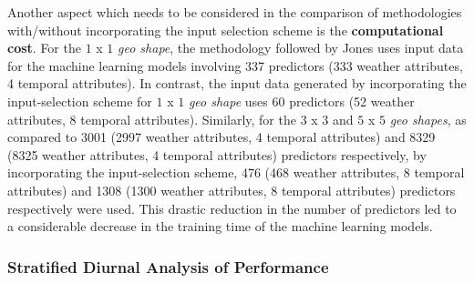 \par Another aspect which needs to be considered in the comparison of methodologies with/without incorporating the input selection scheme is the \textbf{computational cost}. For the $1$ x $1$ \textit{geo shape}, the methodology followed by Jones \cite{thesis_zach} uses input data for the machine learning models involving 337 predictors (333 weather attributes, 4 temporal attributes). In contrast, the input data generated by incorporating the input-selection scheme for $1$ x $1$ \textit{geo shape} uses 60 predictors (52 weather attributes, 8 temporal attributes). Similarly, for the $3$ x $3$ and $5$ x $5$ \textit{geo shapes}, as compared to 3001 (2997 weather attributes, 4 temporal attributes) and 8329 (8325 weather attributes, 4 temporal attributes) predictors respectively, by incorporating the input-selection scheme, 476 (468 weather attributes, 8 temporal attributes) and 1308 (1300 weather attributes, 8 temporal attributes) predictors respectively were used. This drastic reduction in the number of predictors led to a considerable decrease in the training time of the machine learning models.

\subsubsection*{Stratified Diurnal Analysis of Performance}

